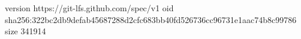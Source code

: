 version https://git-lfs.github.com/spec/v1
oid sha256:322bc2db9defab45687288d2cfc683bb40fd526736cc96731e1aac74b8c99786
size 341914
